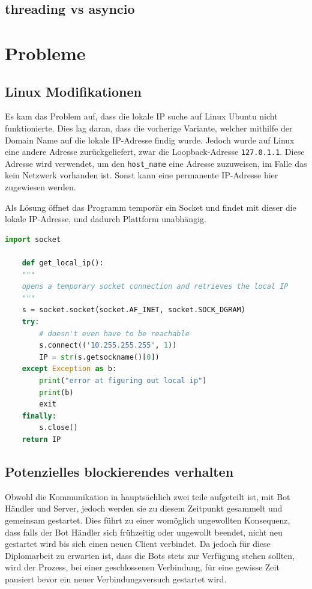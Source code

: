 \subsection{threading vs asyncio}

\section{Probleme}
\subsection{Linux Modifikationen}
Es kam das Problem auf, dass die lokale IP suche auf Linux Ubuntu nicht funktionierte.
Dies lag daran, dass die vorherige Variante, 
welcher mithilfe der Domain Name auf die lokale IP-Adresse findig wurde.
Jedoch wurde auf Linux eine andere Adresse zurückgeliefert, 
zwar die Loopback-Adresse \texttt{127.0.1.1}. 
Diese Adresse wird verwendet, um den \texttt{host\_name} eine Adresse zuzuweisen,
im Falle das kein Netzwerk vorhanden ist. 
Sonst kann eine permanente IP-Adresse hier zugewiesen werden.

Als Lösung öffnet das Programm temporär ein Socket 
und findet mit dieser die lokale IP-Adresse, und dadurch Plattform unabhängig.
\begin{lstlisting}[language=python, gobble=4]
    import socket

    def get_local_ip():
    """
    opens a temporary socket connection and retrieves the local IP
    """
    s = socket.socket(socket.AF_INET, socket.SOCK_DGRAM)
    try:
        # doesn't even have to be reachable
        s.connect(('10.255.255.255', 1))
        IP = str(s.getsockname()[0])
    except Exception as b:
        print("error at figuring out local ip")
        print(b)
        exit
    finally:
        s.close()
    return IP
\end{lstlisting}

\subsection{Potenzielles blockierendes verhalten}
Obwohl die Kommunikation in hauptsächlich zwei  teile aufgeteilt ist, mit 
Bot Händler und Server, 
jedoch werden sie zu diesem Zeitpunkt gesammelt und gemeinsam gestartet.
Dies führt zu einer womöglich ungewollten Konsequenz,
dass falls der Bot Händler sich frühzeitig oder ungewollt beendet, 
nicht neu gestartet wird bis sich einen neuen Client verbindet.
% 
Da jedoch für diese Diplomarbeit zu erwarten ist, 
dass die Bots stets zur Verfügung stehen sollten,
wird der Prozess, bei einer geschlossenen Verbindung,
für eine gewisse Zeit pausiert bevor ein neuer Verbindungsversuch gestartet wird.

